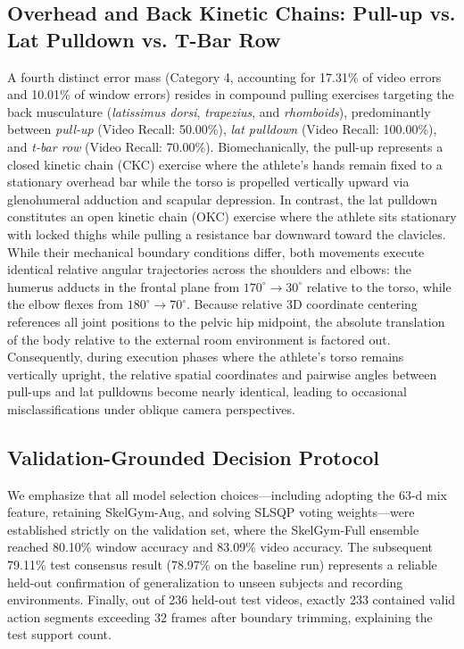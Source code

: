 \documentclass[runningheads]{llncs}
\begin{document}
\subsection{Overhead and Back Kinetic Chains: Pull-up vs. Lat Pulldown vs. T-Bar Row}
A fourth distinct error mass (Category 4, accounting for 17.31\% of video errors and 10.01\% of window errors) resides in compound pulling exercises targeting the back musculature (\textit{latissimus dorsi}, \textit{trapezius}, and \textit{rhomboids}), predominantly between \textit{pull-up} (Video Recall: 50.00\%), \textit{lat pulldown} (Video Recall: 100.00\%), and \textit{t-bar row} (Video Recall: 70.00\%).
Biomechanically, the pull-up represents a closed kinetic chain (CKC) exercise where the athlete's hands remain fixed to a stationary overhead bar while the torso is propelled vertically upward via glenohumeral adduction and scapular depression. In contrast, the lat pulldown constitutes an open kinetic chain (OKC) exercise where the athlete sits stationary with locked thighs while pulling a resistance bar downward toward the clavicles. While their mechanical boundary conditions differ, both movements execute identical relative angular trajectories across the shoulders and elbows: the humerus adducts in the frontal plane from $170^\circ \to 30^\circ$ relative to the torso, while the elbow flexes from $180^\circ \to 70^\circ$. Because relative 3D coordinate centering references all joint positions to the pelvic hip midpoint, the absolute translation of the body relative to the external room environment is factored out. Consequently, during execution phases where the athlete's torso remains vertically upright, the relative spatial coordinates and pairwise angles between pull-ups and lat pulldowns become nearly identical, leading to occasional misclassifications under oblique camera perspectives.

\subsection{Validation-Grounded Decision Protocol}\label{sec:val_protocol}
We emphasize that all model selection choices---including adopting the 63-d mix feature, retaining SkelGym-Aug, and solving SLSQP voting weights---were established strictly on the validation set, where the SkelGym-Full ensemble reached 80.10\% window accuracy and 83.09\% video accuracy. The subsequent 79.11\% test consensus result (78.97\% on the baseline run) represents a reliable held-out confirmation of generalization to unseen subjects and recording environments. Finally, out of 236 held-out test videos, exactly 233 contained valid action segments exceeding 32 frames after boundary trimming, explaining the test support count.
\end{document}
